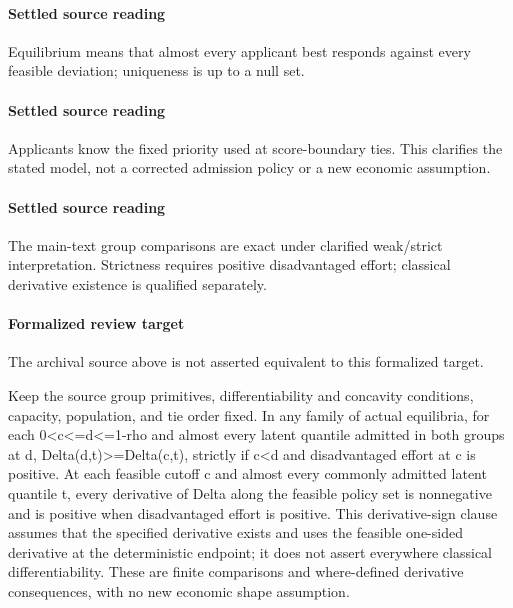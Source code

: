 \documentclass[10pt]{article}
\begin{document}
\paragraph{Settled source reading}
\begin{sloppypar}
Equilibrium means that almost every applicant best responds against every feasible deviation;\allowbreak{} uniqueness is up to a null set.\allowbreak{}
\end{sloppypar}
\paragraph{Settled source reading}
\begin{sloppypar}
Applicants know the fixed priority used at score-\allowbreak{}boundary ties.\allowbreak{} This clarifies the stated model, not a corrected admission policy or a new economic assumption.\allowbreak{}
\end{sloppypar}
\paragraph{Settled source reading}
\begin{sloppypar}
The main-\allowbreak{}text group comparisons are exact under clarified weak/\allowbreak{}strict interpretation.\allowbreak{} Strictness requires positive disadvantaged effort;\allowbreak{} classical derivative existence is qualified separately.\allowbreak{}
\end{sloppypar}
\paragraph{Formalized review target}
The archival source above is not asserted equivalent to this formalized target.
\begin{ReviewVerbatim}
Keep the source group primitives, differentiability and concavity conditions, capacity, population, and tie order fixed. In any family of actual equilibria, for each 0<c<=d<=1-rho and almost every latent quantile admitted in both groups at d, Delta(d,t)>=Delta(c,t), strictly if c<d and disadvantaged effort at c is positive. At each feasible cutoff c and almost every commonly admitted latent quantile t, every derivative of Delta along the feasible policy set is nonnegative and is positive when disadvantaged effort is positive. This derivative-sign clause assumes that the specified derivative exists and uses the feasible one-sided derivative at the deterministic endpoint; it does not assert everywhere classical differentiability. These are finite comparisons and where-defined derivative consequences, with no new economic shape assumption.
\end{ReviewVerbatim}
\end{document}
